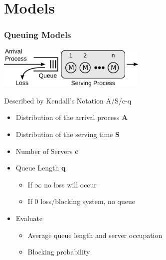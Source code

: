 \documentclass{beamer}
\begin{document}
\section{Models}

\begin{frame}
	\frametitle{Queuing Models}

	\begin{center}
		\includegraphics[height=2cm]{figures/kendall-model.pdf}
	\end{center}

	Described by Kendall's Notation A/S/c-q
	\begin{itemize}
	\item Distribution of the arrival process \textbf{A}
	\item Distribution of the serving time \textbf{S}
	\item Number of Servers \textbf{c}
	\item Queue Length \textbf{q}
	\begin{itemize}
		\item If $\infty$ no loss will occur
		\item If $0$ loss/blocking system, no queue
	\end{itemize}
	\item Evaluate
		\begin{itemize}
			\item Average queue length and server occupation
			\item Blocking probability
		\end{itemize}
	\end{itemize}
\end{frame}
\end{document}
